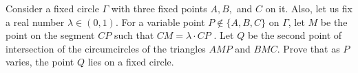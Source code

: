 Consider a fixed circle 
$\Gamma$
 with three fixed points 
$A, B,$
 and 
$C$
 on it. Also, let us fix a real number 
$\lambda \in(0,1)$.
 For a variable point 
$P \not\in\{A, B, C\}$
 on 
$\Gamma$, 
 let 
$M$
 be the point on the segment 
$CP$
 such that 
$CM =\lambda\cdot  CP$
 . Let 
$Q$
 be the second point of intersection of the circumcircles of the triangles 
$AMP$
 and 
$BMC$.
 Prove that as 
$P$
 varies, the point 
$Q$
 lies on a fixed circle.
